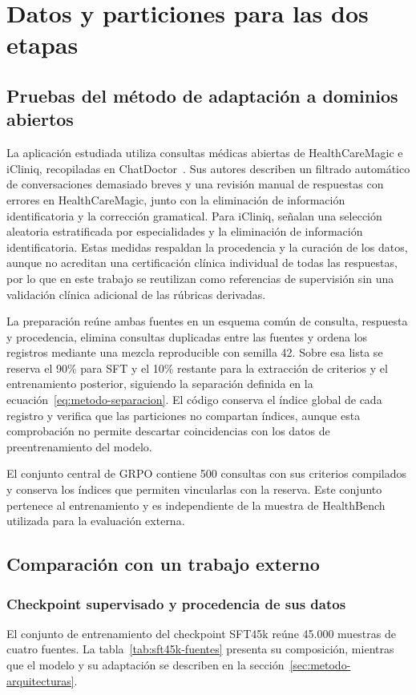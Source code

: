 \section{Datos y particiones para las dos etapas}
\label{sec:datos-experimentales}
\subsection{Pruebas del método de adaptación a dominios abiertos}
\label{sec:protocolo-primera-etapa}
La aplicación estudiada utiliza consultas médicas abiertas de HealthCareMagic e iCliniq, recopiladas en ChatDoctor~\cite{li2023chatdoctor}. Sus autores describen un filtrado automático de conversaciones demasiado breves y una revisión manual de respuestas con errores en HealthCareMagic, junto con la eliminación de información identificatoria y la corrección gramatical. Para iCliniq, señalan una selección aleatoria estratificada por especialidades y la eliminación de información identificatoria. Estas medidas respaldan la procedencia y la curación de los datos, aunque no acreditan una certificación clínica individual de todas las respuestas, por lo que en este trabajo se reutilizan como referencias de supervisión sin una validación clínica adicional de las rúbricas derivadas.

La preparación reúne ambas fuentes en un esquema común de consulta, respuesta y procedencia, elimina consultas duplicadas entre las fuentes y ordena los registros mediante una mezcla reproducible con semilla 42. Sobre esa lista se reserva el 90\% para SFT y el 10\% restante para la extracción de criterios y el entrenamiento posterior, siguiendo la separación definida en la ecuación~\ref{eq:metodo-separacion}. El código conserva el índice global de cada registro y verifica que las particiones no compartan índices, aunque esta comprobación no permite descartar coincidencias con los datos de preentrenamiento del modelo.

El conjunto central de GRPO contiene 500 consultas con sus criterios compilados y conserva los índices que permiten vincularlas con la reserva. Este conjunto pertenece al entrenamiento y es independiente de la muestra de HealthBench utilizada para la evaluación externa.


\subsection{Comparación con un trabajo externo}
\label{sec:protocolo-segunda-etapa}
\subsubsection{Checkpoint supervisado y procedencia de sus datos}
El conjunto de entrenamiento del checkpoint SFT45k reúne 45.000 muestras de cuatro fuentes. La tabla~\ref{tab:sft45k-fuentes} presenta su composición, mientras que el modelo y su adaptación se describen en la sección~\ref{sec:metodo-arquitecturas}.

